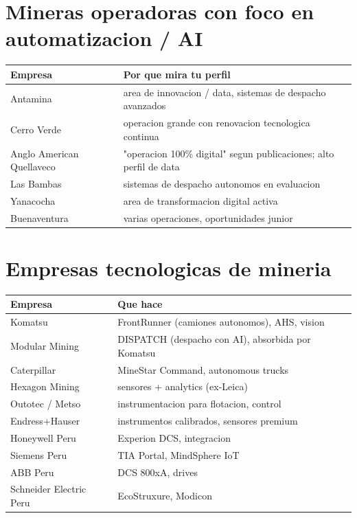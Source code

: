 \documentclass[11pt,a4paper,oneside]{report}
\begin{document}
\section{Mineras operadoras con foco en automatizacion / AI}

\begin{center}
\begin{tabular}{p{4cm}p{8cm}}
\toprule
\textbf{Empresa} & \textbf{Por que mira tu perfil} \\
\midrule
Antamina        & area de innovacion / data, sistemas de despacho avanzados \\
Cerro Verde     & operacion grande con renovacion tecnologica continua \\
Anglo American Quellaveco & "operacion 100\% digital" segun publicaciones; alto perfil de data \\
Las Bambas      & sistemas de despacho autonomos en evaluacion \\
Yanacocha       & area de transformacion digital activa \\
Buenaventura    & varias operaciones, oportunidades junior \\
\bottomrule
\end{tabular}
\end{center}

\section{Empresas tecnologicas de mineria}

\begin{center}
\begin{tabular}{p{4cm}p{8cm}}
\toprule
\textbf{Empresa} & \textbf{Que hace} \\
\midrule
Komatsu          & FrontRunner (camiones autonomos), AHS, vision \\
Modular Mining   & DISPATCH (despacho con AI), absorbida por Komatsu \\
Caterpillar      & MineStar Command, autonomous trucks \\
Hexagon Mining   & sensores + analytics (ex-Leica) \\
Outotec / Metso  & instrumentacion para flotacion, control \\
Endress+Hauser   & instrumentos calibrados, sensores premium \\
Honeywell Peru   & Experion DCS, integracion \\
Siemens Peru     & TIA Portal, MindSphere IoT \\
ABB Peru         & DCS 800xA, drives \\
Schneider Electric Peru & EcoStruxure, Modicon \\
\bottomrule
\end{tabular}
\end{center}
\end{document}
